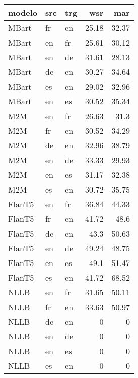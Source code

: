 \begin{tabular}{lllrr}
\hline
 modelo   & src   & trg   &   wsr &   mar \\
\hline
 MBart    & fr    & en    & 25.18 & 32.37 \\
 MBart    & en    & fr    & 25.61 & 30.12 \\
 MBart    & en    & de    & 31.61 & 28.13 \\
 MBart    & de    & en    & 30.27 & 34.64 \\
 MBart    & es    & en    & 29.02 & 32.96 \\
 MBart    & en    & es    & 30.52 & 35.34 \\
 M2M      & en    & fr    & 26.63 & 31.3  \\
 M2M      & fr    & en    & 30.52 & 34.29 \\
 M2M      & de    & en    & 32.96 & 38.79 \\
 M2M      & en    & de    & 33.33 & 29.93 \\
 M2M      & en    & es    & 31.17 & 32.38 \\
 M2M      & es    & en    & 30.72 & 35.75 \\
 FlanT5   & en    & fr    & 36.84 & 44.33 \\
 FlanT5   & fr    & en    & 41.72 & 48.6  \\
 FlanT5   & de    & en    & 43.3  & 50.63 \\
 FlanT5   & en    & de    & 49.24 & 48.75 \\
 FlanT5   & en    & es    & 49.1  & 51.47 \\
 FlanT5   & es    & en    & 41.72 & 68.52 \\
 NLLB     & en    & fr    & 31.65 & 50.11 \\
 NLLB     & fr    & en    & 33.63 & 50.97 \\
 NLLB     & de    & en    &  0    &  0    \\
 NLLB     & en    & de    &  0    &  0    \\
 NLLB     & en    & es    &  0    &  0    \\
 NLLB     & es    & en    &  0    &  0    \\
\hline
\end{tabular}